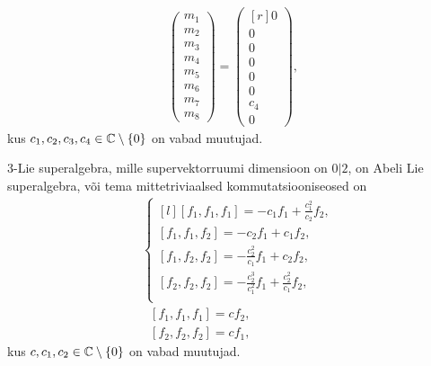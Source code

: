 \begin{align*}
\begin{pmatrix}
        m_1 \\
        m_2 \\
        m_3 \\
        m_4 \\
        m_5 \\
        m_6 \\
        m_7 \\
        m_8
    \end{pmatrix}
    =
    \begin{pmatrix*}[r]
        0 \\
        0 \\
        0 \\
        0 \\
        0 \\
        0 \\
        c_4 \\
        0
    \end{pmatrix*},
\end{align*}
\renewcommand\arraystretch{1}
kus $c_1, c_2, c_3, c_4 \in \mathbb{C} \setminus \{0\}$ on vabad muutujad.

\begin{lau}
    $3$-Lie superalgebra, mille supervektorruumi dimensioon on $0|2$, on Abeli
    Lie superalgebra, või tema mittetriviaalsed kommutatsiooniseosed on
    \renewcommand\arraystretch{1.5}
    \begin{align}
        & \left\{
            \begin{matrix*}[l]
                [f_1, f_1, f_1] = -c_1 f_1 + \frac{c_1^2}{c_2} f_2, \\
                [f_1, f_1, f_2] = -c_2 f_1 + c_1 f_2, \\
                [f_1, f_2, f_2] = -\frac{c_2^2}{c_1} f_1 + c_2 f_2, \\
                [f_2, f_2, f_2] = -\frac{c_2^3}{c_1^2} f_1 +
                    \frac{c_2^2}{c_1} f_2, \\
            \end{matrix*}
        \right. \\[0.2cm]
        &\ \ \ [f_1, f_1, f_1] = c f_2, \\[0.2cm]
        &\ \ \ [f_2, f_2, f_2] = c f_1,
    \end{align}
    \renewcommand\arraystretch{1}
    kus $c, c_1, c_2 \in \mathbb{C} \setminus \{ 0 \}$ on vabad muutujad.
\end{lau}
